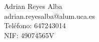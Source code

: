 Adrian Reyes Alba \\ %
adrian.reyesalba@alum.uca.es \\ %
Teléfono: 647243014 \\ %
NIF: 49074565V \\ %
